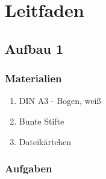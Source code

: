 
\def\mytitle{Leitfaden für Participtory Design}
\def\myauthor{Anastasia Kazakova, Bengt Lüers}
\def\latexmode{memoir}
\def\bibliocommand{}
\def\bibliostyle{chicago}

\pagebreak

\chapter{Leitfaden}
\label{leitfaden}

\section{Aufbau 1}
\label{aufbau1}

\subsection{Materialien}
\label{materialien}

\begin{enumerate}
\item DIN A3 - Bogen, weiß

\item Bunte Stifte

\item Dateikärtchen

\end{enumerate}

\subsection{Aufgaben}
\label{aufgaben}

